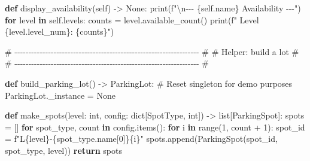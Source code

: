 \documentclass[11pt]{article}
\newenvironment{Shaded}{\begin{snugshade}}{\end{snugshade}}
\newcommand{\BuiltInTok}[1]{\textcolor[rgb]{0.50,0.55,0.55}{#1}}
\newcommand{\CharTok}[1]{\textcolor[rgb]{0.24,0.68,0.91}{#1}}
\newcommand{\CommentTok}[1]{\textcolor[rgb]{0.48,0.49,0.49}{#1}}
\newcommand{\ControlFlowTok}[1]{\textcolor[rgb]{0.99,0.74,0.29}{\textbf{#1}}}
\newcommand{\DecValTok}[1]{\textcolor[rgb]{0.96,0.45,0.00}{#1}}
\newcommand{\KeywordTok}[1]{\textcolor[rgb]{0.81,0.81,0.76}{\textbf{#1}}}
\newcommand{\NormalTok}[1]{\textcolor[rgb]{0.81,0.81,0.76}{#1}}
\newcommand{\OperatorTok}[1]{\textcolor[rgb]{0.81,0.81,0.76}{#1}}
\newcommand{\SpecialCharTok}[1]{\textcolor[rgb]{0.24,0.68,0.91}{#1}}
\newcommand{\SpecialStringTok}[1]{\textcolor[rgb]{0.85,0.27,0.33}{#1}}
\newcommand{\VariableTok}[1]{\textcolor[rgb]{0.15,0.68,0.68}{#1}}
\begin{document}
\begin{Shaded}
\begin{Highlighting}[]
    \KeywordTok{def}\NormalTok{ display\_availability(}\VariableTok{self}\NormalTok{) }\OperatorTok{{-}\textgreater{}} \VariableTok{None}\NormalTok{:}
        \BuiltInTok{print}\NormalTok{(}\SpecialStringTok{f"}\CharTok{\textbackslash{}n}\SpecialStringTok{{-}{-}{-} }\SpecialCharTok{\{}\VariableTok{self}\SpecialCharTok{.}\NormalTok{name}\SpecialCharTok{\}}\SpecialStringTok{ Availability {-}{-}{-}"}\NormalTok{)}
        \ControlFlowTok{for}\NormalTok{ level }\KeywordTok{in} \VariableTok{self}\NormalTok{.levels:}
\NormalTok{            counts }\OperatorTok{=}\NormalTok{ level.available\_count()}
            \BuiltInTok{print}\NormalTok{(}\SpecialStringTok{f"  Level }\SpecialCharTok{\{}\NormalTok{level}\SpecialCharTok{.}\NormalTok{level\_num}\SpecialCharTok{\}}\SpecialStringTok{: }\SpecialCharTok{\{}\NormalTok{counts}\SpecialCharTok{\}}\SpecialStringTok{"}\NormalTok{)}


\CommentTok{\# {-}{-}{-}{-}{-}{-}{-}{-}{-}{-}{-}{-}{-}{-}{-}{-}{-}{-}{-}{-}{-}{-}{-}{-}{-}{-}{-}{-}{-}{-}{-}{-}{-}{-}{-}{-}{-}{-}{-}{-}{-}{-}{-}{-}{-}{-}{-}{-}{-}{-}{-}{-}{-}{-}{-}{-}{-}{-}{-}{-}{-}{-}{-}{-}{-}{-} \#}
\CommentTok{\# Helper: build a lot                                                 \#}
\CommentTok{\# {-}{-}{-}{-}{-}{-}{-}{-}{-}{-}{-}{-}{-}{-}{-}{-}{-}{-}{-}{-}{-}{-}{-}{-}{-}{-}{-}{-}{-}{-}{-}{-}{-}{-}{-}{-}{-}{-}{-}{-}{-}{-}{-}{-}{-}{-}{-}{-}{-}{-}{-}{-}{-}{-}{-}{-}{-}{-}{-}{-}{-}{-}{-}{-}{-}{-} \#}

\KeywordTok{def}\NormalTok{ build\_parking\_lot() }\OperatorTok{{-}\textgreater{}}\NormalTok{ ParkingLot:}
    \CommentTok{\# Reset singleton for demo purposes}
\NormalTok{    ParkingLot.\_instance }\OperatorTok{=} \VariableTok{None}

    \KeywordTok{def}\NormalTok{ make\_spots(level: }\BuiltInTok{int}\NormalTok{, config: }\BuiltInTok{dict}\NormalTok{[SpotType, }\BuiltInTok{int}\NormalTok{]) }\OperatorTok{{-}\textgreater{}} \BuiltInTok{list}\NormalTok{[ParkingSpot]:}
\NormalTok{        spots }\OperatorTok{=}\NormalTok{ []}
        \ControlFlowTok{for}\NormalTok{ spot\_type, count }\KeywordTok{in}\NormalTok{ config.items():}
            \ControlFlowTok{for}\NormalTok{ i }\KeywordTok{in} \BuiltInTok{range}\NormalTok{(}\DecValTok{1}\NormalTok{, count }\OperatorTok{+} \DecValTok{1}\NormalTok{):}
\NormalTok{                spot\_id }\OperatorTok{=} \SpecialStringTok{f"L}\SpecialCharTok{\{}\NormalTok{level}\SpecialCharTok{\}}\SpecialStringTok{{-}}\SpecialCharTok{\{}\NormalTok{spot\_type}\SpecialCharTok{.}\NormalTok{name[}\DecValTok{0}\NormalTok{]}\SpecialCharTok{\}\{}\NormalTok{i}\SpecialCharTok{\}}\SpecialStringTok{"}
\NormalTok{                spots.append(ParkingSpot(spot\_id, spot\_type, level))}
        \ControlFlowTok{return}\NormalTok{ spots}


\end{Highlighting}
\end{Shaded}
\end{document}
